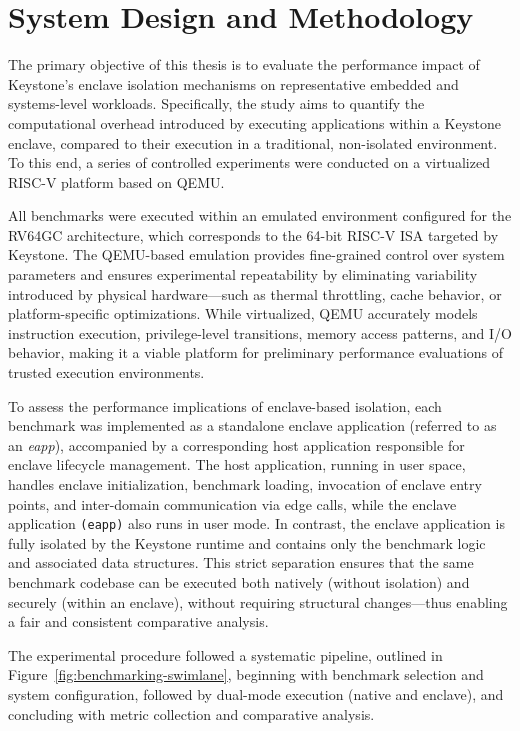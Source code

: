 \chapter{System Design and Methodology}
\label{chap:methodology}

The primary objective of this thesis is to evaluate the performance impact of Keystone’s enclave isolation mechanisms on representative embedded and systems-level workloads. Specifically, the study aims to quantify the computational overhead introduced by executing applications within a Keystone enclave, compared to their execution in a traditional, non-isolated environment. To this end, a series of controlled experiments were conducted on a virtualized RISC-V platform based on QEMU.

All benchmarks were executed within an emulated environment configured for the RV64GC architecture, which corresponds to the 64-bit RISC-V ISA targeted by Keystone. The QEMU-based emulation provides fine-grained control over system parameters and ensures experimental repeatability by eliminating variability introduced by physical hardware—such as thermal throttling, cache behavior, or platform-specific optimizations. While virtualized, QEMU accurately models instruction execution, privilege-level transitions, memory access patterns, and I/O behavior, making it a viable platform for preliminary performance evaluations of trusted execution environments.

To assess the performance implications of enclave-based isolation, each benchmark was implemented as a standalone enclave application (referred to as an \textit{eapp}), accompanied by a corresponding host application responsible for enclave lifecycle management. The host application, running in user space, handles enclave initialization, benchmark loading, invocation of enclave entry points, and inter-domain communication via edge calls, while the enclave application \texttt{(eapp)} also runs in user mode. In contrast, the enclave application is fully isolated by the Keystone runtime and contains only the benchmark logic and associated data structures. This strict separation ensures that the same benchmark codebase can be executed both natively (without isolation) and securely (within an enclave), without requiring structural changes—thus enabling a fair and consistent comparative analysis.

The experimental procedure followed a systematic pipeline, outlined in Figure~\ref{fig:benchmarking-swimlane}, beginning with benchmark selection and system configuration, followed by dual-mode execution (native and enclave), and concluding with metric collection and comparative analysis.

